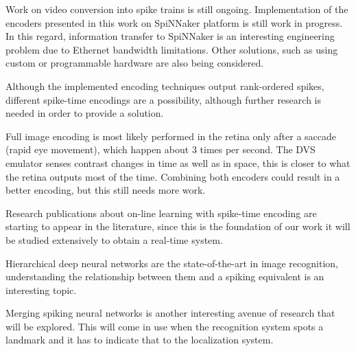Work on video conversion into spike trains is still ongoing. Implementation of the encoders presented in this work on SpiNNaker platform is still work in progress. In this regard, information transfer to SpiNNaker is an interesting engineering problem due to Ethernet bandwidth limitations. Other solutions, such as using custom or programmable hardware are also being considered. %
 
Although the implemented encoding techniques output rank-ordered spikes, different spike-time encodings are a possibility, although further research is needed in order to provide a solution.

Full image encoding is most likely performed in the retina only after a saccade (rapid eye movement), which happen about 3 times per second. The DVS emulator senses contrast changes in time as well as in space, this is closer to what the retina outputs most of the time. Combining both encoders could result in a better encoding, but this still needs more work.

Research publications about on-line learning with spike-time encoding are starting to appear in the literature, since this is the foundation of our work it will be studied  extensively to obtain a real-time system.

Hierarchical deep neural networks are the state-of-the-art in image recognition, understanding the relationship between them and a spiking equivalent is an interesting topic.

Merging spiking neural networks is another interesting avenue of research that will be explored. This will come in use when the recognition system spots a landmark and it has to indicate that to the localization system.

